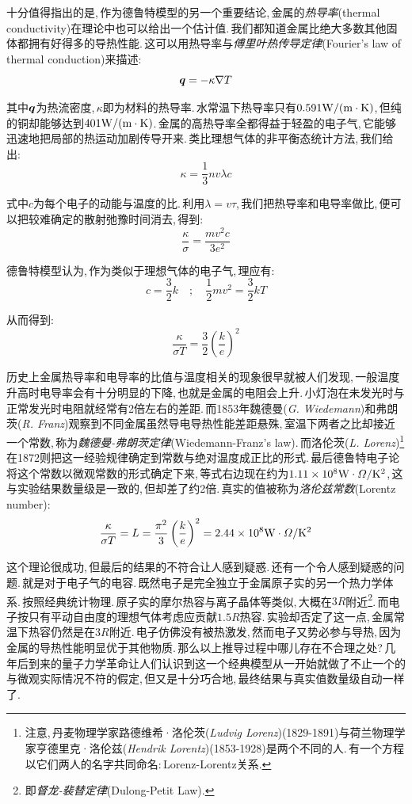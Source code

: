 十分值得指出的是,\,作为德鲁特模型的另一个重要结论,\,金属的\emph{热导率}(thermal conductivity)在理论中也可以给出一个估计值.\,我们都知道金属比绝大多数其他固体都拥有好得多的导热性能.\,这可以用热导率与\emph{傅里叶热传导定律}(Fourier's law of thermal conduction)来描述:
\[\boldsymbol{q}=-\kappa \nabla T\]

其中$\boldsymbol{q}$为热流密度,\,$\kappa$即为材料的热导率.\,水常温下热导率只有$0.591 \rm W/(m\cdot K)$,\,但纯的铜却能够达到$401 \rm W/(m\cdot K)$.\,金属的高热导率全都得益于轻盈的电子气,\,它能够迅速地把局部的热运动加剧传导开来.\,类比理想气体的非平衡态统计方法,\,我们给出:
\[\kappa=\frac{1}{3}nv\lambda c\]

式中$c$为每个电子的动能与温度的比.\,利用$\lambda=v\tau$,\,我们把热导率和电导率做比,\,便可以把较难确定的散射弛豫时间消去,\,得到:
\[\frac{\kappa}{\sigma}=\frac{mv^2c}{3e^2}\]

德鲁特模型认为,\,作为类似于理想气体的电子气,\,理应有:
\[c=\frac{3}{2}k\quad ;\quad \frac{1}{2}mv^2=\frac{3}{2}kT \]

从而得到:
\[\frac{\kappa}{\sigma T}=\frac{3}{2}\left(\frac{k}{e}\right)^2\]

历史上金属热导率和电导率的比值与温度相关的现象很早就被人们发现,\,一般温度升高时电导率会有十分明显的下降,\,也就是金属的电阻会上升.\,小灯泡在未发光时与正常发光时电阻就经常有2倍左右的差距.\,而1853年魏德曼({\it G. Wiedemann})和弗朗茨({\it R. Franz})观察到不同金属虽然导电导热性能差距悬殊,\,室温下两者之比却接近一个常数,\,称为\emph{魏德曼-弗朗茨定律}(Wiedemann-Franz's law).\,而洛伦茨({\it L. Lorenz})\footnote{注意,\,丹麦物理学家路德维希·洛伦茨({\it Ludvig Lorenz})(1829-1891)与荷兰物理学家亨德里克·洛伦兹({\it Hendrik Lorentz})(1853-1928)是两个不同的人.\,有一个方程以它们两人的名字共同命名:\,Lorenz-Lorentz关系.}在1872则把这一经验规律确定到常数与绝对温度成正比的形式.\,最后德鲁特电子论将这个常数以微观常数的形式确定下来,\,等式右边现在约为$1.11\times 10^{8} \rm W \cdot\varOmega /K^2$,\,这与实验结果数量级是一致的,\,但却差了约2倍.\,真实的值被称为\emph{洛伦兹常数}(Lorentz number):
\[\frac{\kappa}{\sigma T}=L=\frac{\pi^2}{3}\left(\frac{k}{e}\right)^2=2.44\times 10^{8} \rm W \cdot\varOmega /K^2\]

这个理论很成功,\,但最后的结果的不符合让人感到疑惑.\,还有一个令人感到疑惑的问题.\,就是对于电子气的电容.\,既然电子是完全独立于金属原子实的另一个热力学体系.\,按照经典统计物理.\,原子实的摩尔热容与离子晶体等类似,\,大概在$3R$附近\footnote{即\emph{督龙-裴替定律}(Dulong-Petit Law).}.\,而电子按只有平动自由度的理想气体考虑应贡献$1.5R$热容.\,实验却否定了这一点,\,金属常温下热容仍然是在$3R$附近.\,电子仿佛没有被热激发,\,然而电子又势必参与导热,\,因为金属的导热性能明显优于其他物质.\,那么以上推导过程中哪儿存在不合理之处?\,几年后到来的量子力学革命让人们认识到这一个经典模型从一开始就做了不止一个的与微观实际情况不符的假定,\,但又是十分巧合地,\,最终结果与真实值数量级自动一样了.


